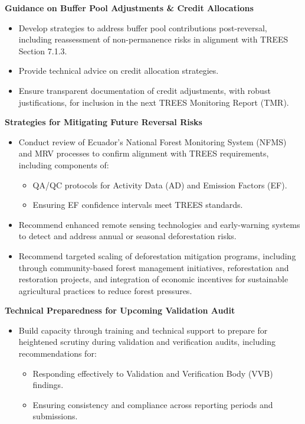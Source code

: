 \documentclass[
  letterpaper,
  DIV=11,
  numbers=noendperiod]{scrartcl}
\providecommand{\tightlist}{%
  \setlength{\itemsep}{0pt}\setlength{\parskip}{0pt}}\usepackage{longtable,booktabs,array}
\begin{document}
\textbf{Guidance on Buffer Pool Adjustments \& Credit Allocations}

\begin{itemize}
\tightlist
\item
  Develop strategies to address buffer pool contributions post-reversal,
  including reassessment of non-permanence risks in alignment with TREES
  Section 7.1.3.
\item
  Provide technical advice on credit allocation strategies.
\item
  Ensure transparent documentation of credit adjustments, with robust
  justifications, for inclusion in the next TREES Monitoring Report
  (TMR).
\end{itemize}

\textbf{Strategies for Mitigating Future Reversal Risks}

\begin{itemize}
\tightlist
\item
  Conduct review of Ecuador's National Forest Monitoring System (NFMS)
  and MRV processes to confirm alignment with TREES requirements,
  including components of:

  \begin{itemize}
  \tightlist
  \item
    QA/QC protocols for Activity Data (AD) and Emission Factors (EF).
  \item
    Ensuring EF confidence intervals meet TREES standards.
  \end{itemize}
\item
  Recommend enhanced remote sensing technologies and early-warning
  systems to detect and address annual or seasonal deforestation risks.
\item
  Recommend targeted scaling of deforestation mitigation programs,
  including through community-based forest management initiatives,
  reforestation and restoration projects, and integration of economic
  incentives for sustainable agricultural practices to reduce forest
  pressures.
\end{itemize}

\textbf{Technical Preparedness for Upcoming Validation Audit}

\begin{itemize}
\item
  Build capacity through training and technical support to prepare for
  heightened scrutiny during validation and verification audits,
  including recommendations for:

  \begin{itemize}
  \item
    Responding effectively to Validation and Verification Body (VVB)
    findings.
  \item
    Ensuring consistency and compliance across reporting periods and
    submissions.
  \end{itemize}
\end{itemize}
\end{document}
